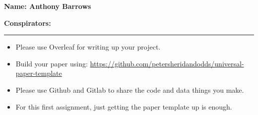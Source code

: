 \textbf{Name: Anthony Barrows} \\

\medskip

\textbf{Conspirators:} 

\medskip
\medskip

\hrule

\medskip


\assignmentsonly{\pleasesubmitprojectdraft}

\begin{itemize}
\item 
  Please use Overleaf for writing up your project.
\item
  Build your paper using:
  \url{https://github.com/petersheridandodds/universal-paper-template}
\item
  Please use Github and Gitlab to share the code and data things you make.
\item
  For this first assignment, just getting the paper template up is enough.
\end{itemize}

